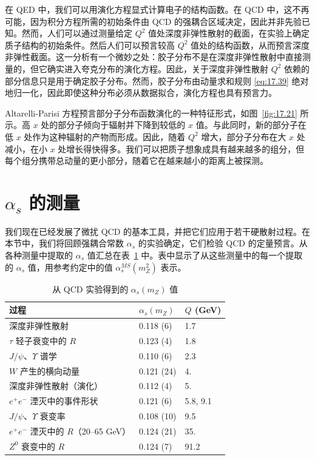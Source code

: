 在 QED 中，我们可以用演化方程显式计算电子的结构函数。在 QCD 中，这不再可能，因为积分方程所需的初始条件由 QCD 的强耦合区域决定，因此并非先验已知。然而，人们可以通过测量给定 $Q^2$ 值处深度非弹性散射的截面，在实验上确定质子结构的初始条件。然后人们可以预言较高 $Q^2$ 值处的结构函数，从而预言深度非弹性截面。这一分析有一个微妙之处：胶子分布不是在深度非弹性散射中直接测量的，但它确实进入夸克分布的演化方程。因此，关于深度非弹性散射 $Q^2$ 依赖的部分信息只是用于确定胶子分布。然而，胶子分布由动量求和规则 \eqref{eq:17.39} 绝对地归一化，因此即使这种分布必须从数据拟合，演化方程也具有预言力。

Altarelli-Parisi 方程预言部分子分布函数演化的一种特征形式，如图~\ref{fig:17.21} 所示。高 $x$ 处的部分子倾向于辐射并下降到较低的 $x$ 值。与此同时，新的部分子在低 $x$ 处作为这种辐射的产物而形成。因此，随着 $Q^2$ 增大，部分子分布在大 $x$ 处减小，在小 $x$ 处增长得快得多。我们可以把质子想象成具有越来越多的组分，但每个组分携带总动量的更小部分，随着它在越来越小的距离上被探测。

\section{$\alpha_s$ 的测量}

我们现在已经发展了微扰 QCD 的基本工具，并把它们应用于若干硬散射过程。在本节中，我们将回顾强耦合常数 $\alpha_s$ 的实验确定，它们检验 QCD 的定量预言。从各种测量中提取的 $\alpha_s$ 值汇总在表~\ref{tab:17.1} 中。表中显示了从这些测量中的每一个提取的 $\alpha_s$ 值，用参考约定中的值 $\alpha_s^{\overline{MS}}(m_Z^2)$ 表示。

\begin{table}[t]
  \centering
  \caption{从 QCD 实验得到的 $\alpha_s(m_Z)$ 值}
  \begin{tabular}{lll}
    \toprule
    过程 & $\alpha_s(m_Z)$ & $Q$ (GeV)\\
    \midrule
    深度非弹性散射 & 0.118 (6) & 1.7\\
    $\tau$ 轻子衰变中的 $R$ & 0.123 (4) & 1.8\\
    $J/\psi$、$\Upsilon$ 谱学 & 0.110 (6) & 2.3\\
    $W$ 产生的横向动量 & 0.121 (24) & 4.\\
    深度非弹性散射（演化） & 0.112 (4) & 5.\\
    $e^{+}e^{-}$ 湮灭中的事件形状 & 0.121 (6) & 5.8, 9.1\\
    $J/\psi$、$\Upsilon$ 衰变率 & 0.108 (10) & 9.5\\
    $e^{+}e^{-}$ 湮灭中的 $R$（20--65 GeV） & 0.124 (21) & 35.\\
    $Z^0$ 衰变中的 $R$ & 0.124 (7) & 91.2\\
    \bottomrule
  \end{tabular}
  \label{tab:17.1}
\end{table}

